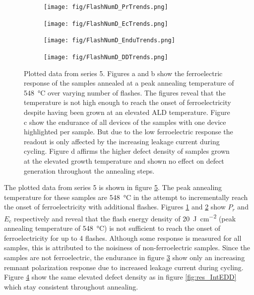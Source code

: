\documentclass[11pt,twoside,final]{eitExjobb}  %
\begin{document}
\begin{figure}[htbp]
    \centering
    \begin{subfigure}{.4\linewidth}
        \texttt{[image: fig/FlashNumD\_PrTrends.png]}
        \caption{}\label{fig:res_NumDPr}
    \end{subfigure}
    \begin{subfigure}{.4\linewidth}
        \texttt{[image: fig/FlashNumD\_EcTrends.png]}
        \caption{}\label{fig:res_NumDEc}
    \end{subfigure}
    \begin{subfigure}{.4\linewidth}
        \texttt{[image: fig/FlashNumD\_EnduTrends.png]}
        \caption{}\label{fig:res_NumDEndu}
    \end{subfigure}
    \begin{subfigure}{.4\linewidth}
        \texttt{[image: fig/FlashNumD\_DDTrends.png]}
        \caption{}\label{fig:res_NumDDD}
    \end{subfigure}
    \caption{Plotted data from series 5. Figures a and b show the
    ferroelectric response of the samples annealed at a peak annealing
    temperature of \SI{548}{\celsius} over varying number of flashes. The figures
    reveal that the temperature is not high enough to reach the onset of
    ferroelectricity despite having been grown at an elevated ALD temperature.
    Figure c show the endurance of all devices of the samples with one device
    highlighted per sample. But due to the low ferroelectric response the
    readout is only affected by the increasing leakage current during cycling.
    Figure d affirms the higher defect density of samples grown at the elevated
    growth temperature and shown no effect on defect generation throughout the
    annealing steps.}\label{fig:res_NumD}
\end{figure}

The plotted data from series 5 is shown in figure \ref{fig:res_NumD}. The
peak annealing temperature for these samples are \SI{548}{\celsius} in the
attempt to incrementally reach the onset of ferroelectricity with additional
flashes. Figures \ref{fig:res_NumDPr} and \ref{fig:res_NumDEc} show $P_r$ and
$E_c$ respectively and reveal that the flash energy density of
\SI{20}{\joule\per\centi\meter\squared} (peak annealing temperature of
\SI{548}{\celsius}) is not sufficient to reach the onset of ferroelectricity
for up to 4 flashes. Although some response is measured for all samples, this
is attributed to the noisiness of non-ferroelectric samples. Since the samples
are not ferroelectric, the endurance in figure \ref{fig:res_NumDEndu} show only
an increasing remnant polarization response due to increased leakage current
during cycling. Figure \ref{fig:res_NumDDD} show the same elevated defect
density as in figure \ref{fig:res_IntEDD} which stay consistent throughout
annealing.
\end{document}
